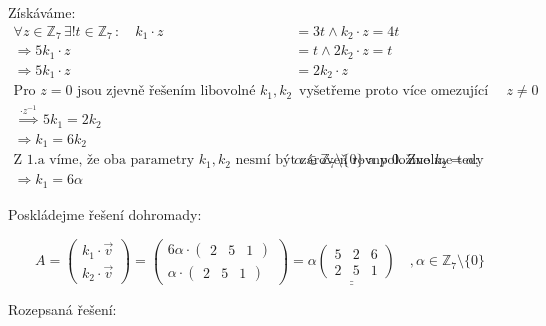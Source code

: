 \documentclass[12pt]{article}
\begin{document}
\begin{enumerate}
\begin{enumerate}
    Získáváme:
    \begin{align*}
      \forall z \in \mathbb{Z}_7 \,\exists ! t \in \mathbb{Z}_7 \,: \quad k_1 \cdot z &= 3t \land k_2 \cdot z = 4t \\
      \Longrightarrow 5k_1 \cdot z &= t \land 2k_2 \cdot z = t \\
      \Longrightarrow 5k_1 \cdot z &= 2k_2 \cdot z \\
      \text{Pro } z=0 \text{ jsou zjevně řešením libovolné } k_1, k_2 &\text{ vyšetřeme proto více omezující rovnici, kde } z \neq 0 \\
      \overset{\cdot z^{-1}}{\;\Longrightarrow\;} 5k_1 = 2k_2 \\
      \Longrightarrow k_1 = 6k_2 \\
      \text{Z 1.a víme, že oba parametry $k_1,k_2$ nesmí být zároveň rovny 0. Zvolme tedy parametr } &\alpha \in \mathbb{Z}_7 \setminus \{0\}
      \text{ a položme } k_2 = \alpha: \\
      \Longrightarrow k_1 = 6\alpha
    \end{align*}

    \end{enumerate}

    Poskládejme řešení dohromady:

    \[
      A = \left(\begin{array}{c} k_1 \cdot \vec{v} \\ \hline k_2 \cdot \vec{v} \end{array}\right)
      = \left(\begin{array}{c} 6\alpha \cdot \left(\begin{array}{ccc} 2 & 5 & 1 \end{array}\right)
         \\ \hline \alpha \cdot \left(\begin{array}{ccc} 2 & 5 & 1 \end{array}\right) \end{array}
      \right)
      = \underline{\underline{\alpha \left(\begin{array}{ccc}
          5 & 2 & 6 \\
          2 & 5 & 1
      \end{array}\right)}} \quad , \alpha \in \mathbb{Z}_7 \setminus \{0\}
    \]

    Rozepsaná řešení:


\end{enumerate}
\end{document}
